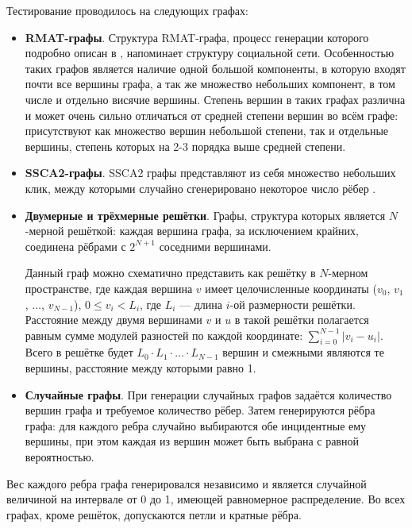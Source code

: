 \documentclass[a4paper,12pt]{extarticle}
\begin{document}
Тестирование проводилось на следующих графах:
\begin{itemize}
    \item \textbf{RMAT-графы}. Структура RMAT-графа, процесс генерации которого подробно описан в \cite{rmat-graph}, напоминает структуру социальной сети. Особенностью таких графов является наличие одной большой компоненты, в которую входят почти все вершины графа, а так же множество небольших компонент, в том числе и отдельно висячие вершины. Степень вершин в таких графах различна и может очень сильно отличаться от средней степени вершин во всём графе: присутствуют как множество вершин небольшой степени, так и отдельные вершины, степень которых на 2-3 порядка выше средней степени.
    
    \item \textbf{SSCA2-графы}. SSCA2 графы представляют из себя множество небольших клик, между которыми случайно сгенерировано некоторое число рёбер \cite{ssca2-graph}.
    
    \item \textbf{Двумерные и трёхмерные решётки}. Графы, структура которых является $N$-мерной решёткой: каждая вершина графа, за исключением крайних, соединена рёбрами с $2^{N+1}$ соседними вершинами.
    
    Данный граф можно схематично представить как решётку в $N$-мерном пространстве, где каждая вершина $v$ имеет целочисленные координаты ($v_0$, $v_1$, $\ldots$, $v_{N-1}$), $0 \leq v_i < L_i$, где $L_i$ --- длина $i$-ой размерности решётки. Расстояние между двумя вершинами $v$ и $u$ в такой решётки полагается равным сумме модулей разностей по каждой координате: $\displaystyle \sum_{i=0}^{N-1} |v_i - u_i|$. 
    Всего в решётке будет $L_0 \cdot L_1 \cdot \ldots \cdot L_{N-1}$ вершин и смежными являются те вершины, расстояние между которыми равно 1.
    
    \item \textbf{Случайные графы}. 
        При генерации случайных графов задаётся количество вершин графа и требуемое количество рёбер. Затем генерируются рёбра графа: для каждого ребра случайно выбираются обе инцидентные ему вершины, при этом каждая из вершин может быть выбрана с равной вероятностью.
\end{itemize}

Вес каждого ребра графа генерировался независимо и является случайной величиной на интервале от 0 до 1, имеющей равномерное распределение. Во всех графах, кроме решёток, допускаются петли и кратные рёбра.
\end{document}
